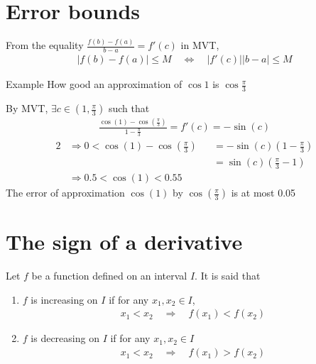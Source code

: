 \documentclass{report}
\begin{document}
	\section{Error bounds}

		From the equality $\frac{f(b) - f(a)}{b-a} = f'(c)$ in MVT,
		\begin{align*}
			|f(b) - f(a)| \leq M \quad \Longleftrightarrow \quad |f'(c)||b-a| \leq M
		\end{align*}

		\begin{question}{Example}
			How good an approximation of $\cos 1$ is $\cos \frac{\pi}{3}$

			By MVT, $\exists c \in \left(1, \frac{\pi}{3}\right)$ such that
			\begin{align*}
				\frac{\cos(1) - \cos\left(\frac{\pi}{3}\right)}{1 - \frac{\pi}{3}} = f'(c) = -\sin(c)
			\end{align*}
			\begin{alignat*}{2}
				&\Rightarrow 0 < \cos(1) - \cos \left(\frac{\pi}{3}\right) &&= -\sin(c) \left(1 - \frac{\pi}{3}\right)	\\
				& &&= \sin(c) \left(\frac{\pi}{3}-1\right)	\\
				&\Rightarrow 0.5 < \cos(1) < 0.55
			\end{alignat*}
			The error of approximation $\cos(1)$ by $\cos(\frac{\pi}{3})$ is at most 0.05
		\end{question}

	\section{The sign of a derivative}

		Let $f$ be a function defined on an interval $I$. It is said that
		\begin{enumerate}
			\item $f$ is increasing on $I$ if for any $x_1,x_2 \in I$,
				\begin{align*}
					x_1 < x_2 \quad \Longrightarrow \quad f(x_1) < f(x_2)
				\end{align*}
			\item $f$ is decreasing on $I$ if for any $x_1,x_2 \in I$
				\begin{align*}
					x_1 < x_2 \quad \Longrightarrow \quad f(x_1) > f(x_2)
				\end{align*}
		\end{enumerate}
\end{document}
